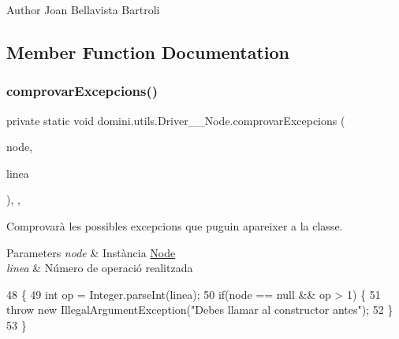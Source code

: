 \begin{DoxyAuthor}{Author}
Joan Bellavista Bartroli 
\end{DoxyAuthor}


\subsection{Member Function Documentation}
\mbox{\label{classdomini_1_1utils_1_1Driver____Node_a9fdd311953250227bb70d67cbf20bbb4}} 
\subsubsection{\texorpdfstring{comprovar\+Excepcions()}{comprovarExcepcions()}}
{\footnotesize\ttfamily private static void domini.\+utils.\+Driver\+\_\+\+\_\+\+Node.\+comprovar\+Excepcions (\begin{DoxyParamCaption}\item[{\hyperlink{classdomini_1_1utils_1_1Node}{Node}}]{node,  }\item[{String}]{linea }\end{DoxyParamCaption})\hspace{0.3cm}{\ttfamily [inline]}, {\ttfamily [static]}, {\ttfamily [private]}}



Comprovarà les possibles excepcions que puguin apareixer a la classe. 


\begin{DoxyParams}{Parameters}
{\em node} & Instància \hyperlink{classdomini_1_1utils_1_1Node}{Node} \\
\hline
{\em linea} & Número de operació realitzada \\
\hline
\end{DoxyParams}

\begin{DoxyCode}
48                                                                     \{
49         \textcolor{keywordtype}{int} op = Integer.parseInt(linea);
50         \textcolor{keywordflow}{if}(node == null && op > 1) \{
51             \textcolor{keywordflow}{throw} \textcolor{keyword}{new} IllegalArgumentException(\textcolor{stringliteral}{"Debes llamar al constructor antes"});
52         \}
53     \}
\end{DoxyCode}
\mbox{\label{classdomini_1_1utils_1_1Driver____Node_abfb5f35b8100dec9d147a79af04df017}} 
